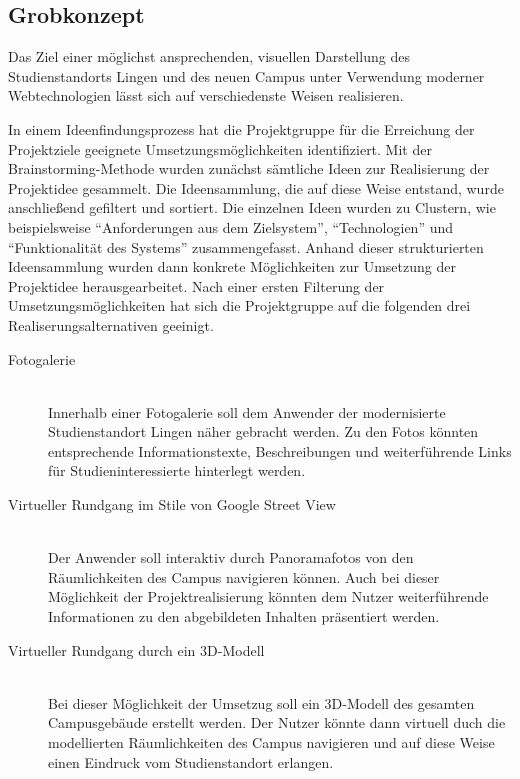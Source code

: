 \subsection{Grobkonzept}
\label{sec:Grobkonzept}

Das Ziel einer möglichst ansprechenden, visuellen Darstellung des
Studienstandorts Lingen und des neuen Campus unter Verwendung moderner
Webtechnologien lässt sich auf verschiedenste Weisen realisieren. 

In einem Ideenfindungsprozess hat die Projektgruppe für die Erreichung der
Projektziele geeignete Umsetzungsmöglichkeiten identifiziert. Mit der
Brainstorming-Methode wurden zunächst sämtliche Ideen zur Realisierung der
Projektidee gesammelt. Die Ideensammlung, die auf diese Weise entstand, wurde
anschließend gefiltert und sortiert. Die einzelnen Ideen wurden zu Clustern, wie
beispielsweise "`Anforderungen aus dem Zielsystem"', "`Technologien"' und
"`Funktionalität des Systems"' zusammengefasst. Anhand dieser strukturierten
Ideensammlung wurden dann konkrete Möglichkeiten zur Umsetzung der Projektidee
herausgearbeitet. Nach einer ersten Filterung der Umsetzungsmöglichkeiten hat
sich die Projektgruppe auf die folgenden drei Realiserungsalternativen geeinigt. 


\begin{description}
\item[Fotogalerie] \hfill \\
Innerhalb einer Fotogalerie soll dem Anwender der modernisierte Studienstandort
Lingen näher gebracht werden. Zu den Fotos könnten entsprechende
Informationstexte, Beschreibungen und weiterführende Links für
Studieninteressierte hinterlegt werden.
\item[Virtueller Rundgang im Stile von Google Street View] \hfill \\
Der Anwender soll interaktiv durch Panoramafotos von den Räumlichkeiten des
Campus navigieren können. Auch bei dieser Möglichkeit der Projektrealisierung
könnten dem Nutzer weiterführende Informationen zu den abgebildeten Inhalten
präsentiert werden.
\item[Virtueller Rundgang durch ein 3D-Modell] \hfill \\
Bei dieser Möglichkeit der Umsetzug soll ein 3D-Modell des gesamten
Campusgebäude erstellt werden. Der Nutzer könnte dann virtuell duch die
modellierten Räumlichkeiten des Campus navigieren und auf diese Weise einen
Eindruck vom Studienstandort erlangen.
\end{description}

